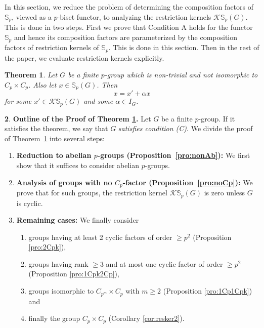 \documentclass[12pt]{article}
\theoremstyle{plain}
\newtheorem{theorem}{Theorem}[section]
\theoremstyle{definition}
\newtheorem{nothing}[theorem]{}
\newcommand{\kerlin}{\mathbb S_p}
\newcommand{\scp}{\mathbb S_p}
\begin{document}
In this section, we reduce the problem of determining the composition factors of \( \kerlin \), viewed as a \( p \)-biset functor, to analyzing the restriction kernels \( \mathcal{K}\kerlin(G) \). This is done in two steps. First we prove that Condition A holds for the functor $\scp$ and hence its composition factors are parameterized by the composition factors of restriction kernels of $\scp$. This is done in this section. Then in the rest of the paper, we evaluate restriction kernels explicitly. 
\begin{theorem}\label{thm:red2Rest}
    Let $G$ be a finite $p$-group which is non-trivial and not isomorphic to $C_p\times C_p$. Also let $x\in \kerlin(G)$. Then \[ x = x' + \alpha x\] for some $x'\in \mathcal K\kerlin(G)$ and some $\alpha\in I_G$.
\end{theorem} 
\begin{nothing}{\bf Outline of the Proof of Theorem \ref{thm:red2Rest}.} Let $G$ be a finite $p$-group. If it satisfies the theorem, we say that $G$ {\emph{satisfies condition (C)}}. We divide the proof of Theorem~\ref{thm:red2Rest} into several steps:
\begin{enumerate}
    \item \textbf{Reduction to abelian \( p \)-groups (Proposition~\ref{pro:nonAb}):} We first show that it suffices to consider abelian $p$-groups.
    \item \textbf{Analysis of groups with no \( C_p \)-factor (Proposition~\ref{pro:noCp}):} We prove that for such groups, the restriction kernel \( \mathcal{K}\kerlin(G) \) is zero unless \( G \) is cyclic.
    \item \textbf{Remaining cases:} We finally consider
    \begin{enumerate}
        \item groups having at least 2 cyclic factors of order $\ge p^2$ (Proposition \ref{pro:2Cpk}),
        \item groups having rank $\ge 3$ and at most one cyclic factor of order $\ge p^2$ (Proposition \ref{pro:1Cpk2Cp}),
        \item groups isomorphic to $C_{p^m}\times C_p$ with $m\ge 2$ (Proposition \ref{pro:1Cp1Cpk}) and
        \item finally the group $C_p\times C_p$ (Corollary \ref{cor:resker2}).
    \end{enumerate}   
\end{enumerate}
\end{nothing}
\end{document}
